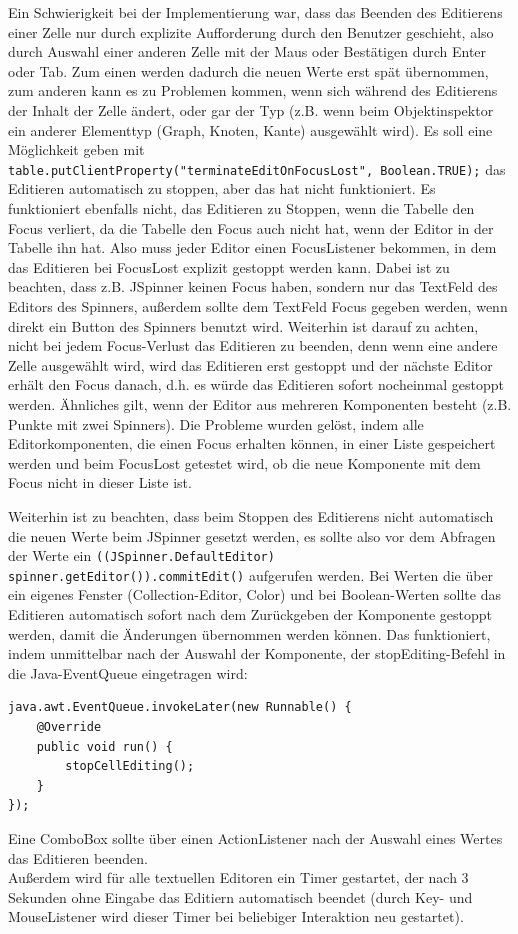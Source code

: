 Ein Schwierigkeit bei der Implementierung war, dass das Beenden des Editierens einer Zelle nur durch explizite Aufforderung durch den Benutzer geschieht, also durch Auswahl einer anderen Zelle mit der Maus oder Bestätigen durch Enter oder Tab. Zum einen werden dadurch die neuen Werte erst spät übernommen, zum anderen kann es zu Problemen kommen, wenn sich während des Editierens der Inhalt der Zelle ändert, oder gar der Typ (z.B. wenn beim Objektinspektor ein anderer Elementtyp (Graph, Knoten, Kante) ausgewählt wird). Es soll eine Möglichkeit geben mit \lstinline{table.putClientProperty("terminateEditOnFocusLost", Boolean.TRUE);} das Editieren automatisch zu stoppen, aber das hat nicht funktioniert. Es funktioniert ebenfalls nicht, das Editieren zu Stoppen, wenn die Tabelle den Focus verliert, da die Tabelle den Focus auch nicht hat, wenn der Editor in der Tabelle ihn hat. Also muss jeder Editor einen FocusListener bekommen, in dem das Editieren bei FocusLost explizit gestoppt werden kann. Dabei ist zu beachten, dass z.B. JSpinner keinen Focus haben, sondern nur das TextFeld des Editors des Spinners, außerdem sollte dem TextFeld Focus gegeben werden, wenn direkt ein Button des Spinners benutzt wird. Weiterhin ist darauf zu achten, nicht bei jedem Focus-Verlust das Editieren zu beenden, denn wenn eine andere Zelle ausgewählt wird, wird das Editieren erst gestoppt und der nächste Editor erhält den Focus danach, d.h. es würde das Editieren sofort nocheinmal gestoppt werden. Ähnliches gilt, wenn der Editor aus mehreren Komponenten besteht (z.B. Punkte mit zwei Spinners). Die Probleme wurden gelöst, indem alle Editorkomponenten, die einen Focus erhalten können, in einer Liste gespeichert werden und beim FocusLost getestet wird, ob die neue Komponente mit dem Focus nicht in dieser Liste ist.

Weiterhin ist zu beachten, dass beim Stoppen des Editierens nicht automatisch die neuen Werte beim JSpinner gesetzt werden, es sollte also vor dem Abfragen der Werte ein \lstinline{((JSpinner.DefaultEditor) spinner.getEditor()).commitEdit()} aufgerufen werden. Bei Werten die über ein eigenes Fenster (Collection-Editor, Color) und bei Boolean-Werten sollte das Editieren automatisch sofort nach dem Zurückgeben der Komponente gestoppt werden, damit die Änderungen übernommen werden können. Das funktioniert, indem unmittelbar nach der Auswahl der Komponente, der stopEditing-Befehl in die Java-EventQueue eingetragen wird:
\begin{lstlisting}
java.awt.EventQueue.invokeLater(new Runnable() {
	@Override
	public void run() {
		stopCellEditing();
	}
});
\end{lstlisting}
Eine ComboBox sollte über einen ActionListener nach der Auswahl eines Wertes das Editieren beenden.\\
Außerdem wird für alle textuellen Editoren ein Timer gestartet, der nach 3 Sekunden ohne Eingabe das Editiern automatisch beendet (durch Key- und MouseListener wird dieser Timer bei beliebiger Interaktion neu gestartet).

